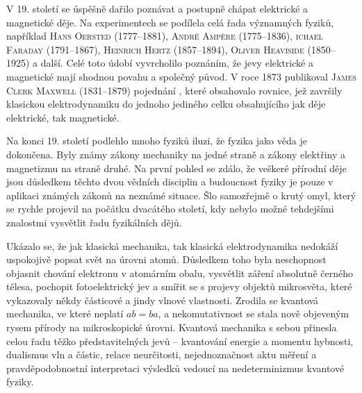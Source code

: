     V 19. století se úspěšně dařilo poznávat a postupně chápat elektrické a magnetické děje. Na
    experimentech se podílela celá řada významných fyziků, například \textsc{Hans Oersted}
    (1777–1881), \textsc{André Ampère} (1775–1836), \textsc{ichael Faraday} (1791–1867),
    \textsc{Heinrich Hertz} (1857–1894), \textsc{Oliver Heaviside} (1850–1925) a další. Celé toto
    údobí vyvrcholilo poznáním, že jevy elektrické a magnetické mají shodnou povahu a společný
    původ. V roce 1873 publikoval \textsc{James Clerk Maxwell} (1831–1879) pojednání , které obsahovalo rovnice, jež završily klasickou elektrodynamiku
    do jednoho jediného celku obsahujícího jak děje elektrické, tak magnetické. 
    
    Na konci 19. století podlehlo mnoho fyziků iluzi, že fyzika jako věda je dokončena. Byly známy
    zákony mechaniky na jedné straně a zákony elektřiny a magnetizmu na straně druhé. Na první
    pohled se zdálo, že veškeré přírodní děje jsou důsledkem těchto dvou vědních disciplin a
    budoucnost fyziky je pouze v aplikaci známých zákonů na neznámé situace. Šlo samozřejmě o krutý
    omyl, který se rychle projevil na počátku dvacátého století, kdy nebylo možné tehdejšími
    znalostmi vysvětlit řadu fyzikálních dějů. 

    Ukázalo se, že jak klasická mechanika, tak klasická elektrodynamika nedokáží uspokojivě popsat
    svět na úrovni atomů. Důsledkem toho byla neschopnost objasnit chování elektronu v atomárním
    obalu, vysvětlit záření absolutně černého tělesa, pochopit fotoelektrický jev a smířit se s
    projevy objektů mikrosvěta, které vykazovaly někdy částicové a jindy vlnové vlastnosti. Zrodila
    se kvantová mechanika, ve které neplatí \(ab = ba\), a nekomutativnost se stala nově objeveným
    rysem přírody na mikroskopické úrovni. Kvantová mechanika s sebou přinesla celou řadu těžko
    představitelných jevů – kvantování energie a momentu hybnosti, dualismus vln a částic, relace
    neurčitosti, nejednoznačnost aktu měření a pravděpodobnostní interpretaci výsledků vedoucí na
    nedeterminizmus kvantové fyziky.

